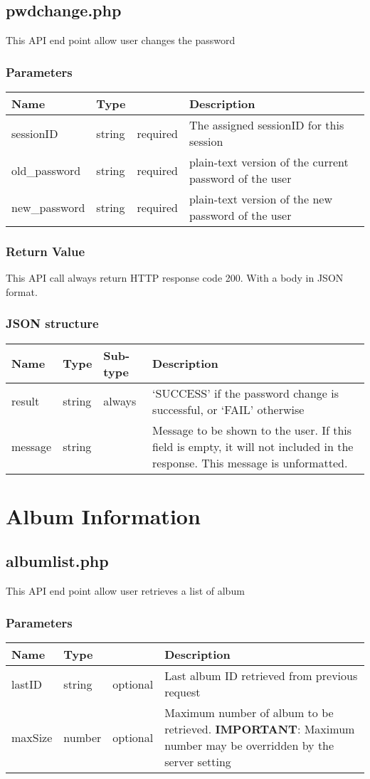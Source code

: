 \documentclass[a4paper,12pt]{report}
\begin{document}
	\section{pwdchange.php}
	This API end point allow user changes the password
	\subsection{Parameters}
	\begin{tabular}{|l|ll|p{10cm}|}
		\hline
		Name & Type & & Description\\\hline
		sessionID & string & required & The assigned sessionID for this session\\\hline
		old\_password & string & required & plain-text version of the current password of the user\\\hline
		new\_password & string & required & plain-text version of the new password of the user\\\hline
	\end{tabular}
	\subsection{Return Value}
	This API call always return HTTP response code 200. With a body in JSON format.
	\subsection{JSON structure}
	\begin{tabular}{|l|l|l|p{10cm}|}
		\hline
		Name & Type & Sub-type & Description\\\hline
		result & string & always & 	`SUCCESS' if the password change is successful, or\newline
		`FAIL' otherwise\\\hline
		message & string & & Message to be shown to the user. If this field is empty, it will not included in the response. This message is unformatted.\\\hline
	\end{tabular}
	\chapter{Album Information}
	\section{albumlist.php}
	This API end point allow user retrieves a list of album
	\subsection{Parameters}
	\begin{tabular}{|l|ll|p{10cm}|}
		\hline
		Name & Type & & Description\\\hline
		lastID & string & optional & Last album ID retrieved from previous request\\\hline
		maxSize & number & optional & Maximum number of album to be retrieved.\newline
		\textbf{IMPORTANT}: Maximum number may be overridden by the server setting \\\hline
	\end{tabular}
\end{document}
